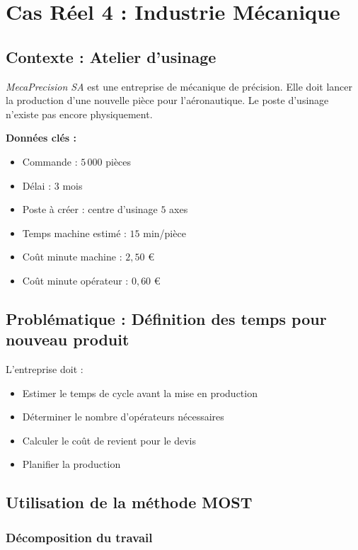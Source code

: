 \documentclass[a4paper,12pt]{article}
\begin{document}
\section{Cas Réel 4 : Industrie Mécanique}

\subsection{Contexte : Atelier d'usinage}

\textit{MecaPrecision SA} est une entreprise de mécanique de précision. Elle doit lancer la production d'une nouvelle pièce pour l'aéronautique. Le poste d'usinage n'existe pas encore physiquement.

\textbf{Données clés :}
\begin{itemize}
    \item Commande : $5\,000$ pièces
    \item Délai : $3$ mois
    \item Poste à créer : centre d'usinage $5$ axes
    \item Temps machine estimé : $15$ min/pièce
    \item Coût minute machine : $2,50$ €
    \item Coût minute opérateur : $0,60$ €
\end{itemize}

\subsection{Problématique : Définition des temps pour nouveau produit}

L'entreprise doit :
\begin{itemize}
    \item Estimer le temps de cycle avant la mise en production
    \item Déterminer le nombre d'opérateurs nécessaires
    \item Calculer le coût de revient pour le devis
    \item Planifier la production
\end{itemize}

\subsection{Utilisation de la méthode MOST}

\subsubsection{Décomposition du travail}
\end{document}
